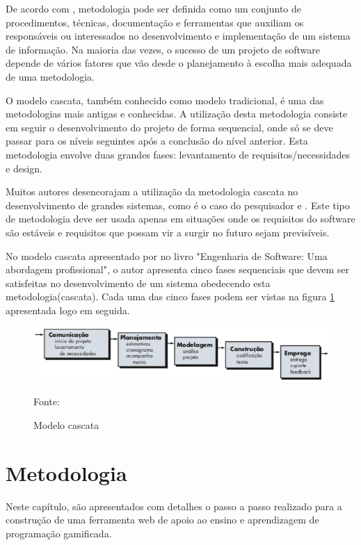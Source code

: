 De acordo com , metodologia pode ser definida como um conjunto de procedimentos, técnicas, documentação e ferramentas que 
auxiliam os responsáveis ou interessados no desenvolvimento e implementação de um sistema de informação. Na maioria das vezes, o sucesso
de um projeto de software depende de vários fatores que vão desde o planejamento à escolha mais adequada de uma metodologia.

O modelo cascata, também conhecido como modelo tradicional, é uma das metodologias mais antigas e conhecidas. A utilização desta 
metodologia consiste em seguir o desenvolvimento do projeto de forma sequencial, onde só se deve passar para os níveis seguintes após
a conclusão do nível anterior. Esta metodologia envolve duas grandes fases: levantamento de requisitos/necessidades e design. \cite{semedo2012ganhos}

Muitos autores desencorajam a utilização da metodologia cascata no desenvolvimento de grandes sistemas, como é o caso do pesquisador
  e . Este tipo de metodologia deve ser usada apenas em situações onde os requisitos do software são estáveis e requisitos
que possam vir a surgir no futuro sejam previsíveis. \cite{semedo2012ganhos}


No modelo cascata apresentado por  no livro "Engenharia de Software: Uma abordagem profissional", o autor
apresenta cinco fases sequenciais que devem ser satisfeitas no desenvolvimento de um sistema obedecendo esta metodologia(cascata). 
Cada uma das cinco fases podem ser vistas na figura \ref{cascata} apresentada logo em seguida.

\begin{figure}[h]
	\centering
	\includegraphics[keepaspectratio=true,scale=0.6]{figuras/cascata.png}
	\caption{Modelo cascata}
	Fonte: \cite{pressman}
	\label{cascata}
\end{figure}


\chapter{Metodologia}

Neste capítulo, são apresentados com detalhes o passo a passo realizado para a construção de uma ferramenta web de apoio ao ensino e aprendizagem 
de programação gamificada.

